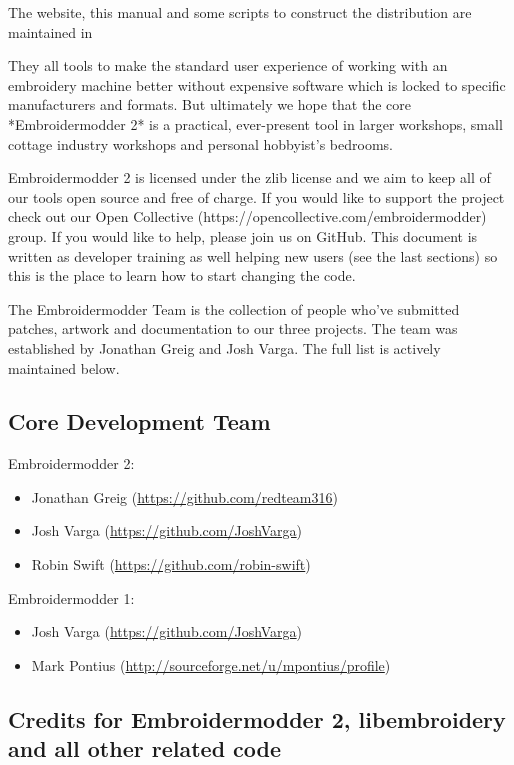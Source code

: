 \documentclass[11pt]{report}
\begin{document}
The website, this manual and some scripts to construct the distribution are
maintained in %

They all tools to make the standard
user experience of working with an embroidery machine better without expensive
software which is locked to specific manufacturers and formats. But ultimately
we hope that the core *Embroidermodder 2* is a practical, ever-present tool in
larger workshops, small cottage industry workshops and personal hobbyist's
bedrooms.

Embroidermodder 2 is licensed under the zlib license and we aim to keep all of our tools open
source and free of charge. If you would like to support the project check out our  Open
Collective (https://opencollective.com/embroidermodder) group.
If you would like to help,
please join us on GitHub. This document is written as developer training as well helping new
users (see the last sections) so this is the place to learn how to start changing the code.

The Embroidermodder Team is the collection of people who've submitted
patches, artwork and documentation to our three projects.
The team was established by Jonathan Greig and Josh Varga.
The full list is actively maintained below.

\subsection{Core Development Team}

Embroidermodder 2:

\begin{itemize}
\item Jonathan Greig (\url{https://github.com/redteam316})
\item Josh Varga (\url{https://github.com/JoshVarga})
\item Robin Swift (\url{https://github.com/robin-swift})
\end{itemize}

Embroidermodder 1:

\begin{itemize}
\item Josh Varga (\url{https://github.com/JoshVarga})
\item Mark Pontius (\url{http://sourceforge.net/u/mpontius/profile})
\end{itemize}

\subsection{Credits for Embroidermodder 2, libembroidery and all other related code}
\end{document}
